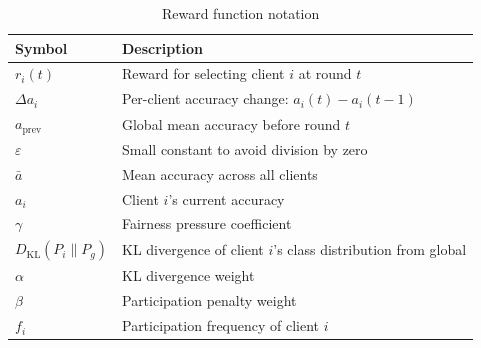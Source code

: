 \begin{table}[h]
\centering
\caption{Reward function notation}
\begin{tabular}{ll}
\toprule
Symbol & Description \\
\midrule
$r_{i}(t)$ & Reward for selecting client $i$ at round $t$ \\
$\Delta a_{i}$ & Per-client accuracy change: $a_{i}(t) - a_{i}(t-1)$ \\
$a_{\text{prev}}$ & Global mean accuracy before round $t$ \\
$\varepsilon$ & Small constant to avoid division by zero \\
$\bar{a}$ & Mean accuracy across all clients \\
$a_{i}$ & Client $i$'s current accuracy \\
$\gamma$ & Fairness pressure coefficient \\
$D_{\text{KL}}(P_{i} \| P_{g})$ & KL divergence of client $i$'s class distribution from global \\
$\alpha$ & KL divergence weight \\
$\beta$ & Participation penalty weight \\
$f_{i}$ & Participation frequency of client $i$ \\
\bottomrule
\end{tabular}
\label{tab:notation}
\end{table}
